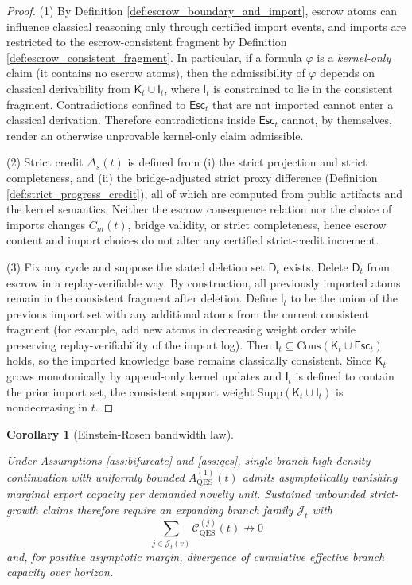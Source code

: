 \documentclass[11pt,a4paper]{article}
\newcommand{\DependsOn}[1]{\par\noindent{\footnotesize\texttt{DependsOn: }\nolinkurl{#1}}\par}
\newtheorem{corollary}{Corollary}
\theoremstyle{definition}
\theoremstyle{remark}
\begin{document}
\begin{proof}
(1) By Definition \ref{def:escrow_boundary_and_import}, escrow atoms can influence classical reasoning only through certified import events, and imports are restricted to the escrow-consistent fragment by Definition \ref{def:escrow_consistent_fragment}.
In particular, if a formula $\varphi$ is a \emph{kernel-only} claim (it contains no escrow atoms), then the admissibility of $\varphi$ depends on classical derivability from $\mathsf K_t\cup \mathsf I_t$, where $\mathsf I_t$ is constrained to lie in the consistent fragment.
Contradictions confined to $\mathsf{Esc}_t$ that are not imported cannot enter a classical derivation.
Therefore contradictions inside $\mathsf{Esc}_t$ cannot, by themselves, render an otherwise unprovable kernel-only claim admissible.

(2) Strict credit $\Delta_s(t)$ is defined from (i) the strict projection and strict completeness, and (ii) the bridge-adjusted strict proxy difference (Definition \ref{def:strict_progress_credit}), all of which are computed from public artifacts and the kernel semantics.
Neither the escrow consequence relation nor the choice of imports changes $C_m(t)$, bridge validity, or strict completeness, hence escrow content and import choices do not alter any certified strict-credit increment.

(3) Fix any cycle and suppose the stated deletion set $\mathsf D_t$ exists.
Delete $\mathsf D_t$ from escrow in a replay-verifiable way.
By construction, all previously imported atoms remain in the consistent fragment after deletion.
Define $\mathsf I_t$ to be the union of the previous import set with any additional atoms from the current consistent fragment (for example, add new atoms in decreasing weight order while preserving replay-verifiability of the import log).
Then $\mathsf I_t\subseteq \mathrm{Cons}(\mathsf K_t\cup \mathsf{Esc}_t)$ holds, so the imported knowledge base remains classically consistent.
Since $\mathsf K_t$ grows monotonically by append-only kernel updates and $\mathsf I_t$ is defined to contain the prior import set, the consistent support weight $\mathrm{Supp}(\mathsf K_t\cup \mathsf I_t)$ is nondecreasing in $t$.
\end{proof}




\begin{corollary}[Einstein-Rosen bandwidth law]\label{cor:erbw}
\DependsOn{global=foundation;refs=[ass:bifurcate,ass:qes]}
Under Assumptions \ref{ass:bifurcate} and \ref{ass:qes}, single-branch high-density continuation with uniformly bounded $A_{\mathrm{QES}}^{(1)}(t)$ admits asymptotically vanishing marginal export capacity per demanded novelty unit.
Sustained unbounded strict-growth claims therefore require an expanding branch family $\mathcal J_t$ with
\[
\sum_{j\in\mathcal J_t(v)}\mathcal C_{\mathrm{QES}}^{(j)}(t)\not\to 0
\]
and, for positive asymptotic margin, divergence of cumulative effective branch capacity over horizon.
\end{corollary}
\end{document}
